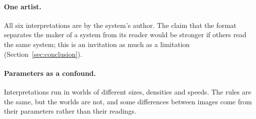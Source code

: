 \paragraph{One artist.} All six interpretations are by the system's author. The claim that the format separates the maker of a system from its reader would be stronger if others read the same system; this is an invitation as much as a limitation (Section~\ref{sec:conclusion}).

\paragraph{Parameters as a confound.} Interpretations run in worlds of different sizes, densities and speeds. The rules are the same, but the worlds are not, and some differences between images come from their parameters rather than their readings.
